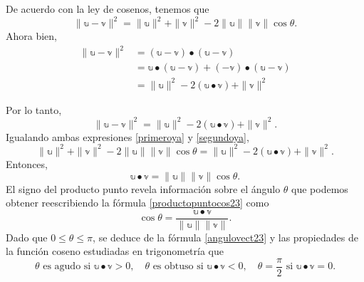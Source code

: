 De acuerdo con la ley de cosenos, tenemos que
\begin{equation}
    \| \mathbb{u} - \mathbb{v} \|^2 = \| \mathbb{u} \|^2 + \| \mathbb{v} \|^2 - 2 \| \mathbb{u} \| \| \mathbb{v} \| \cos \theta. \label{primeroya}
\end{equation}
Ahora bien,
\begin{align*}
    \| \mathbb{u} - \mathbb{v} \|^2 & = (\mathbb{u} - \mathbb{v}) \bullet (\mathbb{u} - \mathbb{v}) \\
    & = \mathbb{u} \bullet (\mathbb{u} - \mathbb{v}) + (-\mathbb{v}) \bullet (\mathbb{u} - \mathbb{v}) \\
    & = \| \mathbb{u} \|^2 - 2(\mathbb{u} \bullet \mathbb{v}) + \| \mathbb{v} \|^2
\end{align*}

\newpage\noindent
Por lo tanto,
\begin{equation}
    \| \mathbb{u} - \mathbb{v} \|^2 = \| \mathbb{u} \|^2 - 2(\mathbb{u} \bullet \mathbb{v}) + \| \mathbb{v} \|^2. \label{segundoya}
\end{equation}
Igualando ambas expresiones \eqref{primeroya} y \eqref{segundoya},
$$\| \mathbb{u} \|^2 + \| \mathbb{v} \|^2 - 2 \| \mathbb{u} \| \| \mathbb{v} \| \cos \theta = \| \mathbb{u} \|^2 - 2(\mathbb{u} \bullet \mathbb{v}) + \| \mathbb{v} \|^2.$$
Entonces,
\begin{equation}
    \mathbb{u} \bullet \mathbb{v} = \| \mathbb{u} \| \| \mathbb{v} \| \cos \theta. \label{productopuntocos23}
\end{equation}
El signo del producto punto revela información sobre el ángulo $\theta$ que podemos obtener reescribiendo la fórmula \eqref{productopuntocos23} como
\begin{equation}
    \cos \theta = \frac{\mathbb{u} \bullet \mathbb{v}}{\|\mathbb{u}\| \|\mathbb{v}\|}. \label{angulovect23}
\end{equation}
Dado que $0 \leq \theta \leq \pi$, se deduce de la fórmula \eqref{angulovect23} y las propiedades de la función coseno estudiadas en trigonometría que
$$\theta \text{ es agudo si } \mathbb{u} \bullet \mathbb{v} > 0, \quad \theta \text{ es obtuso si } \mathbb{u} \bullet \mathbb{v} < 0, \quad \theta = \frac{\pi}{2} \text{ si } \mathbb{u} \bullet \mathbb{v} = 0.$$

